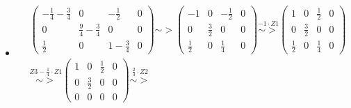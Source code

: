 \begin{itemize}
\begin{itemize}
\begin{align*}
\begin{array}{ccc|c}
1 & 0 &2 &0\\ 0 & \frac{9}{4} & 0 &0\\ \frac{1}{2} & 0 &1 &0
\end{array}\right)\stackrel{Z3-\frac{1}{2}\cdot Z1}{\sim >}
\left(\begin{array}{ccc|c}
1 & 0 & 2 &0\\ 0 & \frac{9}{4} & 0 &0\\ 0 & 0 &0 &0
\end{array}\right)\\
&\stackrel{\frac{4}{9}\cdot Z2}{\sim >}
\left(\begin{array}{ccc|c}
1 & 0 & 2 &0\\ 0 & 1 & 0 &0\\ 0 & 0 &0 &0
\end{array}\right)
\end{align*}
Mit dem $(-1)$-Trick erhalten wir $Eig(A,\lambda_1)=\langle \begin{pmatrix}2 \\ 0\\ -1 \end{pmatrix}\rangle$.
%
\item[$\lambda_2=\frac{3}{4}$]
\begin{align*}
&\left(\begin{array}{ccc|c}
-\frac{1}{4}-\frac{3}{4} & 0 & -\frac{1}{2} &0\\ 0 & \frac{9}{4}-\frac{3}{4} & 0 &0\\ \frac{1}{2} & 0 &1-\frac{3}{4} &0
\end{array}\right){\sim >}
\left(\begin{array}{ccc|c}
-1 & 0 & -\frac{1}{2} &0\\ 0 & \frac{3}{2} & 0 &0\\ \frac{1}{2} & 0 &\frac{1}{4} &0
\end{array}\right)\stackrel{-1\cdot Z1}{\sim >}
\left(\begin{array}{ccc|c}
1 & 0 & \frac{1}{2} &0\\ 0 & \frac{3}{2} & 0 &0\\ \frac{1}{2} & 0 &\frac{1}{4} &0
\end{array}\right)\\
&\stackrel{Z3-\frac{1}{4}\cdot Z1}{\sim >}
\left(\begin{array}{ccc|c}
1 & 0 & \frac{1}{2} &0\\ 0 & \frac{3}{2} & 0 &0\\ 0 & 0 &0 &0
\end{array}\right)\stackrel{\frac{2}{3}\cdot Z2}{\sim >}

\end{align*}
\end{itemize}
\end{itemize}
